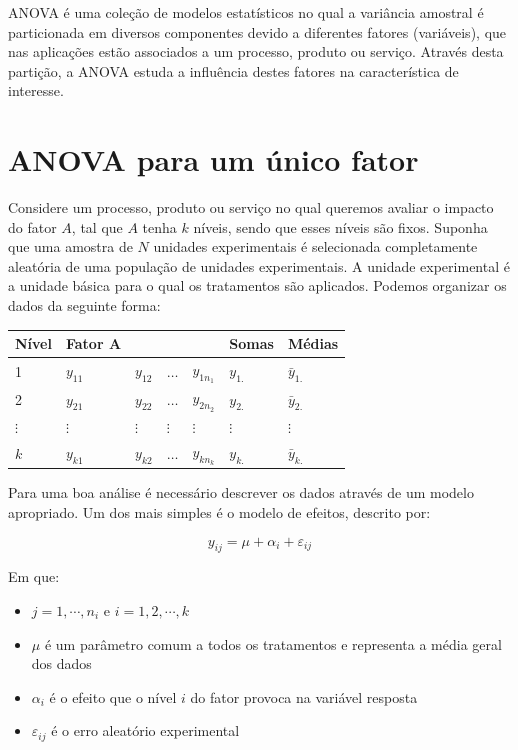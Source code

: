 \documentclass[
]{book}
\providecommand{\tightlist}{%
  \setlength{\itemsep}{0pt}\setlength{\parskip}{0pt}}
\begin{document}
ANOVA é uma coleção de modelos estatísticos no qual a variância amostral é particionada em diversos componentes devido a diferentes fatores (variáveis), que nas aplicações estão associados a um processo, produto ou serviço. Através desta partição, a ANOVA estuda a influência destes fatores na característica de interesse.

\hypertarget{anova-para-um-uxfanico-fator}{%
\section{ANOVA para um único fator}\label{anova-para-um-uxfanico-fator}}

Considere um processo, produto ou serviço no qual queremos avaliar o impacto do fator \(A\), tal que \(A\) tenha \(k\) níveis, sendo que esses níveis são fixos. Suponha que uma amostra de \(N\) unidades experimentais é selecionada completamente aleatória de uma população de unidades experimentais. A unidade experimental é a unidade básica para o qual os tratamentos são aplicados. Podemos organizar os dados da seguinte forma:

\begin{longtable}[]{@{}lllllll@{}}
\toprule
Nível & Fator A & & & & Somas & Médias \\
\midrule
\endhead
1 & \(y_{11}\) & \(y_{12}\) & \(\ldots\) & \(y_{1n_1}\) & \(y_{1.}\) & \(\bar y_{1.}\) \\
2 & \(y_{21}\) & \(y_{22}\) & \(\ldots\) & \(y_{2n_2}\) & \(y_{2.}\) & \(\bar y_{2.}\) \\
\(\vdots\) & \(\vdots\) & \(\vdots\) & \(\vdots\) & \(\vdots\) & \(\vdots\) & \(\vdots\) \\
\(k\) & \(y_{k1}\) & \(y_{k2}\) & \(\ldots\) & \(y_{kn_k}\) & \(y_{k.}\) & \(\bar y_{k.}\) \\
\bottomrule
\end{longtable}

Para uma boa análise é necessário descrever os dados através de um modelo apropriado. Um dos mais simples é o modelo de efeitos, descrito por:

\[y_{ij}=\mu +\alpha_i+\varepsilon_{ij}\]

Em que:

\begin{itemize}
\tightlist
\item
  \(j = 1, \cdots, n_i\) e \(i = 1,2, \cdots,k\)
\item
  \(\mu\) é um parâmetro comum a todos os tratamentos e representa a média geral dos dados
\item
  \(\alpha_{i}\) é o efeito que o nível \(i\) do fator provoca na variável resposta
\item
  \(\varepsilon_{ij}\) é o erro aleatório experimental
\end{itemize}
\end{document}
